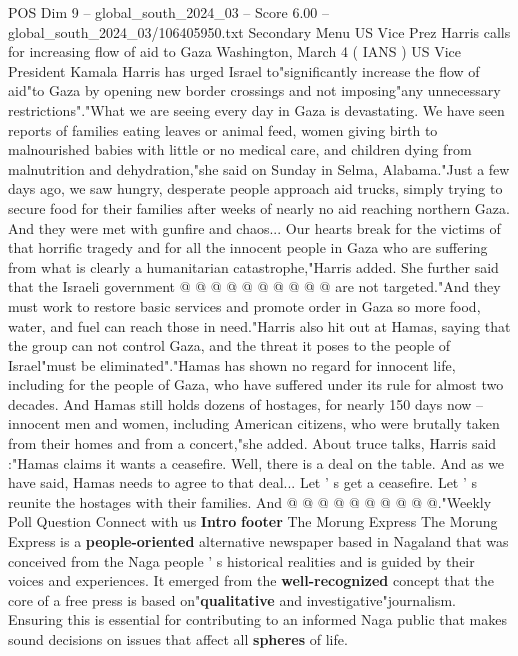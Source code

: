 \begin{textsample}{POS Dim 9 – global\_south\_2024\_03 – Score 6.00 – global\_south\_2024\_03/106405950.txt}  \label{ex:f9_pos_042}
Secondary Menu US Vice Prez Harris calls for increasing flow of aid to Gaza Washington, March 4 ( IANS ) US Vice President Kamala Harris has urged Israel to"significantly increase the flow of aid"to Gaza by opening new border crossings and not imposing"any unnecessary restrictions"."What we are seeing every day in Gaza is devastating.
We have seen reports of families eating leaves or animal feed, women giving birth to malnourished babies with little or no medical care, and children dying from malnutrition and dehydration,"she said on Sunday in Selma, Alabama."Just a few days ago, we saw hungry, desperate people approach aid trucks, simply trying to secure food for their families after weeks of nearly no aid reaching northern Gaza.
And they were met with gunfire and chaos...
Our hearts break for the victims of that horrific tragedy and for all the innocent people in Gaza who are suffering from what is clearly a humanitarian catastrophe,"Harris added.
She further said that the Israeli government @ @ @ @ @ @ @ @ @ @ are not targeted."And they must work to restore basic services and promote order in Gaza so more food, water, and fuel can reach those in need."Harris also hit out at Hamas, saying that the group can not control Gaza, and the threat it poses to the people of Israel"must be eliminated"."Hamas has shown no regard for innocent life, including for the people of Gaza, who have suffered under its rule for almost two decades.
And Hamas still holds dozens of hostages, for nearly 150 days now -- innocent men and women, including American citizens, who were brutally taken from their homes and from a concert,"she added.
About truce talks, Harris said :"Hamas claims it wants a ceasefire.
Well, there is a deal on the table.
And as we have said, Hamas needs to agree to that deal...
Let ' s get a ceasefire.
Let ' s reunite the hostages with their families.
And @ @ @ @ @ @ @ @ @ @."Weekly Poll Question Connect with us \textbf{Intro} \textbf{footer} The Morung Express The Morung Express is a \textbf{people-oriented} alternative newspaper based in Nagaland that was conceived from the Naga people ' s historical realities and is guided by their voices and experiences.
It emerged from the \textbf{well-recognized} concept that the core of a free press is based on"\textbf{qualitative} and investigative"journalism.
Ensuring this is essential for contributing to an informed Naga public that makes sound decisions on issues that affect all \textbf{spheres} of life.

\end{textsample}
